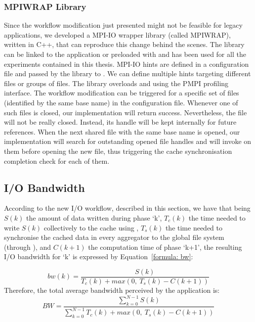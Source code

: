 \subsubsection{MPIWRAP Library}
\label{subsubsec: mpiwrap}
Since the workflow modification just presented might not be feasible for legacy applications, we developed a MPI-IO wrapper library (called MPIWRAP), written in C++, that can reproduce this change behind the scenes. The library can be linked to the 
application or preloaded with  and has been used for all the experiments contained in this thesis. MPI-IO hints are defined in a configuration file and passed by the library to . We can define multiple hints 
targeting different files or groups of files. The library overloads  and  using the PMPI profiling interface. The workflow modification can be triggered for a specific set of files 
(identified by the same base name) in the configuration file. Whenever one of such files is closed, our  implementation will return success. Nevertheless, the file will not be really closed. Instead, its handle will be kept 
internally for future references. When the next shared file with the same base name is opened, our  implementation will search for outstanding opened file handles and will invoke  on them before 
opening the new file, thus triggering the cache synchronisation completion check for each of them.

\subsection{I/O Bandwidth}
\label{subsec: bw-impr}
According to the new I/O workflow, described in this section, we have that being $S(k)$ the amount of data written during phase `k', $T_c(k)$ the time needed to write $S(k)$ collectively to the cache using , 
$T_s(k)$ the time needed to synchronise the cached data in every aggregator to the global file system (through ), and $C(k+1)$ the computation time of phase `k+1', the resulting I/O bandwidth for `k' is expressed 
by Equation~\ref{formula: bw}:

\begin{equation}\label{formula: bw}
        bw(k) = \frac{S(k)}{T_c(k) + max(0,\ T_s(k) - C(k+1))}
\end{equation}
Therefore, the total average bandwidth perceived by the application is:
\begin{equation}\label{formula: abw}
        BW = \frac{\sum_{k=0}^{N-1} S(k)}{\sum_{k=0}^{N-1} T_c(k) + max(0,\ T_s(k) - C(k+1))}
\end{equation}

